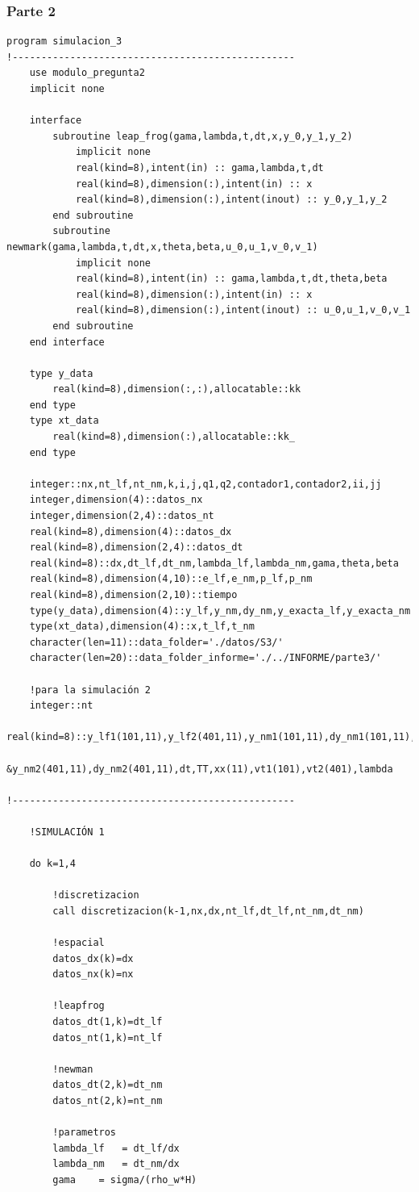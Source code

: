 \documentclass[letterpaper]{article}
\begin{document}
\subsubsection*{Parte 2}
\begin{lstlisting}
program simulacion_3
!-------------------------------------------------
	use modulo_pregunta2
	implicit none
	
	interface
		subroutine leap_frog(gama,lambda,t,dt,x,y_0,y_1,y_2)
			implicit none
			real(kind=8),intent(in)	:: gama,lambda,t,dt
			real(kind=8),dimension(:),intent(in) :: x
			real(kind=8),dimension(:),intent(inout) :: y_0,y_1,y_2
		end subroutine
		subroutine newmark(gama,lambda,t,dt,x,theta,beta,u_0,u_1,v_0,v_1)
			implicit none
			real(kind=8),intent(in)	:: gama,lambda,t,dt,theta,beta
			real(kind=8),dimension(:),intent(in) :: x
			real(kind=8),dimension(:),intent(inout) :: u_0,u_1,v_0,v_1
		end subroutine
	end interface
	
	type y_data
		real(kind=8),dimension(:,:),allocatable::kk
	end type
	type xt_data
		real(kind=8),dimension(:),allocatable::kk_
	end type
	
	integer::nx,nt_lf,nt_nm,k,i,j,q1,q2,contador1,contador2,ii,jj
	integer,dimension(4)::datos_nx
	integer,dimension(2,4)::datos_nt
	real(kind=8),dimension(4)::datos_dx
	real(kind=8),dimension(2,4)::datos_dt
	real(kind=8)::dx,dt_lf,dt_nm,lambda_lf,lambda_nm,gama,theta,beta
	real(kind=8),dimension(4,10)::e_lf,e_nm,p_lf,p_nm
	real(kind=8),dimension(2,10)::tiempo
	type(y_data),dimension(4)::y_lf,y_nm,dy_nm,y_exacta_lf,y_exacta_nm
	type(xt_data),dimension(4)::x,t_lf,t_nm
	character(len=11)::data_folder='./datos/S3/'
	character(len=20)::data_folder_informe='./../INFORME/parte3/'
	
	!para la simulación 2
	integer::nt
	real(kind=8)::y_lf1(101,11),y_lf2(401,11),y_nm1(101,11),dy_nm1(101,11),&
		&y_nm2(401,11),dy_nm2(401,11),dt,TT,xx(11),vt1(101),vt2(401),lambda
	
!-------------------------------------------------

	!SIMULACIÓN 1

	do k=1,4

		!discretizacion
		call discretizacion(k-1,nx,dx,nt_lf,dt_lf,nt_nm,dt_nm)
		
		!espacial
		datos_dx(k)=dx
		datos_nx(k)=nx
		
		!leapfrog
		datos_dt(1,k)=dt_lf
		datos_nt(1,k)=nt_lf
		
		!newman
		datos_dt(2,k)=dt_nm
		datos_nt(2,k)=nt_nm
		
		!parametros
		lambda_lf	= dt_lf/dx
		lambda_nm	= dt_nm/dx
		gama	= sigma/(rho_w*H)
		

\end{lstlisting}
\end{document}
